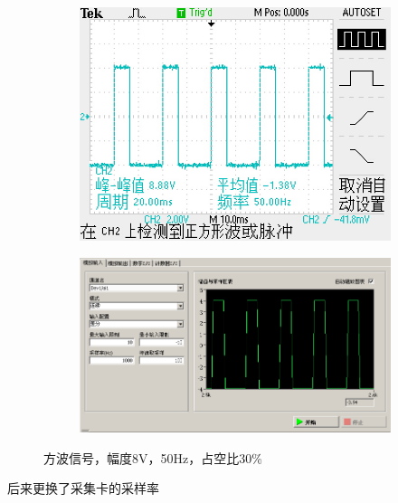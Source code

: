 \documentclass{ctexart}
\begin{document}
\begin{figure}[H]
  \centering
  \begin{subfigure}{0.41\linewidth}
    \includegraphics[width=\linewidth]{LabVIEW使用基础/信号测量系统测试/模拟输入/方波/示波器.JPG}
  \end{subfigure}
  \begin{subfigure}{0.54\linewidth}
    \includegraphics[width=\linewidth]{LabVIEW使用基础/信号测量系统测试/模拟输入/方波/虚拟仪器_采样率1000.PNG}
  \end{subfigure}
  \caption{方波信号，幅度8V，50Hz，占空比30\%}
\end{figure}

后来更换了采集卡的采样率
\end{document}
